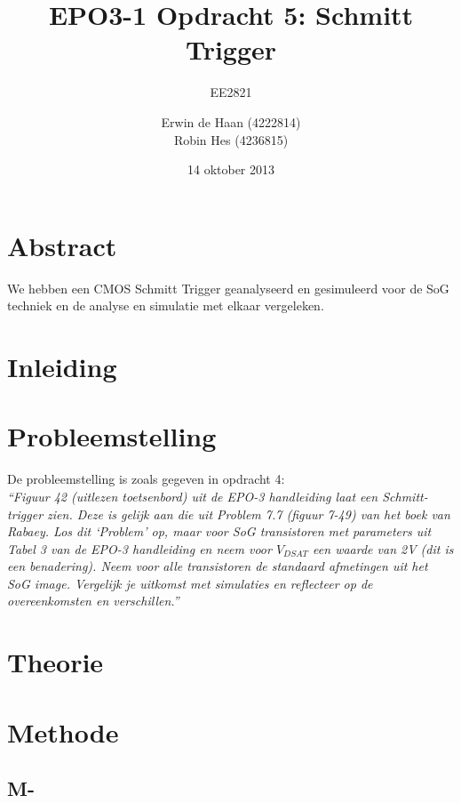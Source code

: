 \documentclass{scrartcl}  %
\author{Erwin {de Haan} (4222814)  \\{Robin Hes} (4236815)}
\title{EPO3-1 Opdracht 5: Schmitt Trigger}
\subtitle{EE2821}
\date{14 oktober 2013}
\begin{document}
\maketitle
\vspace{80 mm}

\section*{Abstract}
\label{sec:trig-abstr}
We hebben een CMOS Schmitt Trigger geanalyseerd en gesimuleerd voor de SoG techniek en de analyse en simulatie met elkaar vergeleken.

\newpage
\setlength{\cftbeforetoctitleskip}{-3em}
\tableofcontents

\section{Inleiding}
\label{sec:trig-inl}

\newpage
{}

\section{Probleemstelling}
\label{sec:trig-prob}
De probleemstelling is zoals gegeven in opdracht 4: \\
\textit{
``Figuur 42 (uitlezen toetsenbord) uit de EPO-3 handleiding laat een Schmitt-trigger zien. Deze is gelijk
aan die uit Problem 7.7 (figuur 7-49) van het boek van Rabaey. Los dit ‘Problem’ op, maar voor SoG
transistoren met parameters uit Tabel 3 van de EPO-3 handleiding en neem voor $V_{DSAT}$ een waarde van
2V (dit is een benadering). Neem voor alle transistoren de standaard afmetingen uit het SoG image.
Vergelijk je uitkomst met simulaties en reflecteer op de overeenkomsten en verschillen.''
}
\cite[2]{epo3-opdracht-5}

\section{Theorie}
\label{sec:trig-theorie}

\section{Methode}
\label{sec:trig-methode}
\subsection{M-}
\label{subsec:trig-methode-minus}
\end{document}
